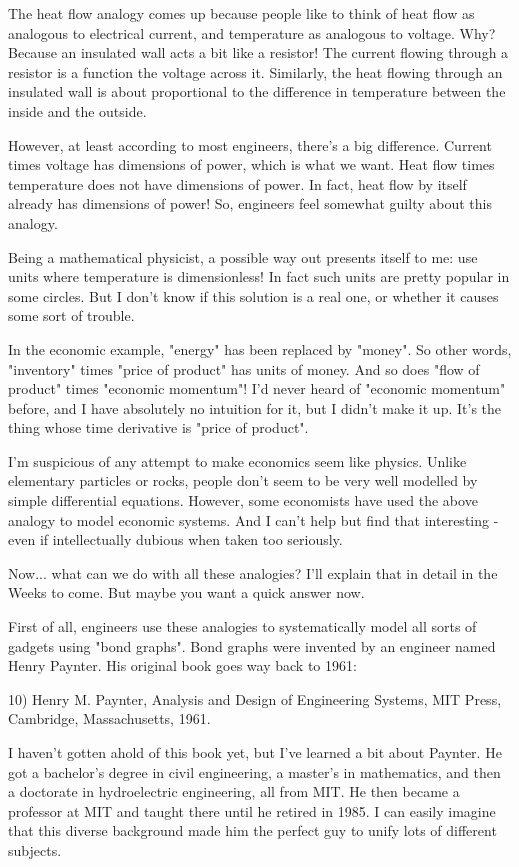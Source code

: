 The heat flow analogy comes up because people like to think of heat
flow as analogous to electrical current, and temperature as analogous
to voltage.  Why?  Because an insulated wall acts a bit like a
resistor!  The current flowing through a resistor is a function the
voltage across it.  Similarly, the heat flowing through an insulated
wall is about proportional to the difference in temperature between
the inside and the outside.

However, at least according to most engineers, there's a big
difference.  Current times voltage has dimensions of power, which is
what we want.  Heat flow times temperature does not have dimensions of
power.  In fact, heat flow by itself already has dimensions of power!
So, engineers feel somewhat guilty about this analogy.

Being a mathematical physicist, a possible way out presents itself to
me: use units where temperature is dimensionless!  In fact such units
are pretty popular in some circles.  But I don't know if this solution
is a real one, or whether it causes some sort of trouble.

In the economic example, "energy" has been replaced by
"money".  So other words, "inventory" times
"price of product" has units of money.  And so does
"flow of product" times "economic momentum"!  I'd
never heard of "economic momentum" before, and I have
absolutely no intuition for it, but I didn't make it up.  It's the
thing whose time derivative is "price of product".

I'm suspicious of any attempt to make economics seem like physics.
Unlike elementary particles or rocks, people don't seem to be very
well modelled by simple differential equations.  However,
some economists have used the above analogy to model economic systems.
And I can't help but find that interesting - even if intellectually
dubious when taken too seriously.

Now... what can we do with all these analogies?  I'll explain that 
in detail in the Weeks to come.  But maybe you want a quick answer
now.  

First of all, engineers use these analogies to systematically model
all sorts of gadgets using "bond graphs".  Bond graphs were invented
by an engineer named Henry Paynter.  His original book goes way back
to 1961:

10) Henry M. Paynter, Analysis and Design of Engineering Systems, MIT
Press, Cambridge, Massachusetts, 1961.

I haven't gotten ahold of this book yet, but I've learned a bit about
Paynter.  He got a bachelor's degree in civil engineering, a master's in
mathematics, and then a doctorate in hydroelectric engineering, all
from MIT.  He then became a professor at MIT and taught there until he
retired in 1985.  I can easily imagine that this diverse background
made him the perfect guy to unify lots of different subjects.

